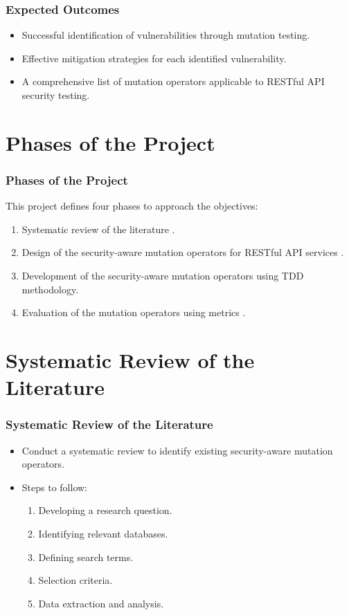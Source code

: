 \documentclass[10pt]{beamer}
\theoremstyle{remark}
\theoremstyle{definition}
\begin{document}
\begin{frame}
    \frametitle{Expected Outcomes}
    \begin{itemize}
        \item Successful identification of vulnerabilities through mutation testing.
        \item Effective mitigation strategies for each identified vulnerability.
        \item A comprehensive list of mutation operators applicable to RESTful API security testing.
    \end{itemize}
\end{frame}

\section{Phases of the Project}
\begin{frame}
    \frametitle{Phases of the Project}
    This project defines four phases to approach the objectives:
    \begin{enumerate}
        \item Systematic review of the literature \cite{Kitchenham2002}.
        \item Design of the security-aware mutation operators for RESTful API services \cite{Peffers2007}.
        \item Development of the security-aware mutation operators using TDD methodology.
        \item Evaluation of the mutation operators using metrics \cite{Ahmed2010}.
    \end{enumerate}
\end{frame}

\section{Systematic Review of the Literature}
\begin{frame}
    \frametitle{Systematic Review of the Literature}
    \begin{itemize}
        \item Conduct a systematic review to identify existing security-aware mutation operators.
        \item Steps to follow:
        \begin{enumerate}
            \item Developing a research question.
            \item Identifying relevant databases.
            \item Defining search terms.
            \item Selection criteria.
            \item Data extraction and analysis.
        \end{enumerate}
    \end{itemize}
\end{frame}
\end{document}
